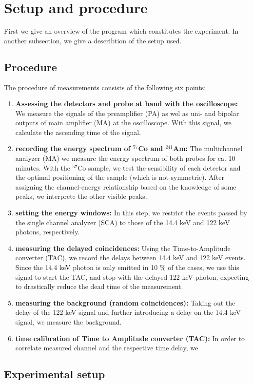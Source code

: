 \section{Setup and procedure}
First we give an overview of the program which constitutes the experiment. In another subsection, 
we give a describtion of the setup used. 
\subsection{Procedure}
The procedure of measurements consists of the following six points:
\begin{enumerate}
    \item 
        \textbf{Assessing the detectors and probe at hand with the oscilloscope:}
        We measure the signals of the preamplifier (PA) as wel as uni- and bipolar outputs of 
        main amplifier (MA) at the oscilloscope. With this signal, we calculate the ascending time 
        of the signal.
    \item 
        \textbf{recording the energy spectrum of $^{57}$Co and $^{241}$Am:}
        The multichannel analyzer (MA) we measure the energy spectrum of both probes 
        for ca. 10 minutes. With the $^{57}$Co sample, we test the sensibility of each detector
        and the optimal positioning of the sample (which is not symmetric). After assigning the 
        channel-energy relationship based on the knowledge of some peaks, we interprete the other visible peaks.
    \item
        \textbf{setting the energy windows:}
        In this step, we restrict the events passed by the single channel analyzer (SCA) to those 
        of the 14.4 keV and 122 keV photons, respectively.
    \item
        \textbf{measuring the delayed coincidences:}
        Using the Time-to-Amplitude converter (TAC), we record the delays between 14.4 keV and 122 keV 
        events. Since the 14.4 keV photon is only emitted in 10 \% of the cases, we use this signal to start the 
        TAC, and stop with the delayed 122 keV photon, expecting to drastically reduce the dead time of the 
        measurement.
    \item
        \textbf{measuring the background (random coincidences):}
        Taking out the delay of the 122 keV signal and further introducing a delay on the 14.4 keV signal, 
        we measure the background. 
    \item
        \textbf{time calibration of Time to Amplitude converter (TAC):}
        In order to correlate measured channel and the respective time delay, we 
\end{enumerate}







\subsection{Experimental setup}


